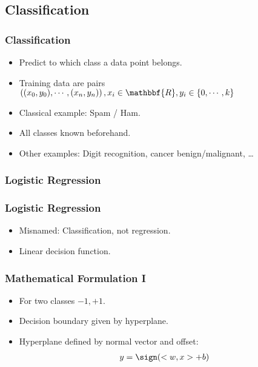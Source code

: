 \subsection{Classification}
\begin{frame}
    \frametitle{Classification}
    \begin{itemize}
        \item Predict to which class a data point belongs.
        \item Training data are pairs $\left( (x_0, y_0), \cdots, (x_n, y_n) \right), x_i \in \mathbbf{R}, y_i \in \{0, \cdots, k\}$
        \item Classical example: Spam / Ham.
        \item All classes known beforehand.
        \item Other examples: Digit recognition, cancer benign/malignant, \ldots
    \end{itemize}
\end{frame}

\subsubsection{Logistic Regression}
\begin{frame}
    \frametitle{Logistic Regression}
    \begin{itemize}
        \item Misnamed: Classification, not regression.
        \item Linear decision function.
    \end{itemize}
\end{frame}

\begin{frame}
    \frametitle{Mathematical Formulation I}
    \begin{itemize}
        \item For two classes $-1, +1$.
        \item Decision boundary given by hyperplane.
        \item Hyperplane defined by normal vector and offset:
            \begin{align}
            y = \sign(<w, x> + b)
            \end{align}
    \end{itemize}
\end{frame}

